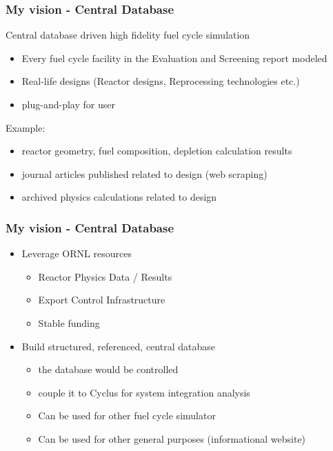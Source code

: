 \begin{frame}
    \frametitle{My vision - Central Database}
    Central database driven high fidelity fuel cycle simulation
    \begin{itemize}
        \item Every fuel cycle facility in the Evaluation and Screening report modeled
        \item Real-life designs (Reactor designs, Reprocessing technologies etc.)
        \item plug-and-play for user
    \end{itemize}
    Example:
    \begin{itemize}
        \item reactor geometry, fuel composition, depletion calculation results
        \item journal articles published related to design (web scraping)
        \item archived physics calculations related to design
    \end{itemize}
\end{frame}


\begin{frame}
    \frametitle{My vision - Central Database}
    \begin{itemize}
        \item Leverage ORNL resources
        \begin{itemize}
            \item Reactor Physics Data / Results
            \item Export Control Infrastructure
            \item Stable funding
        \end{itemize}
        \item Build structured, referenced, central database
        \begin{itemize}
            \item the database would be controlled
            \item couple it to Cyclus for system integration analysis
            \item Can be used for other fuel cycle simulator
            \item Can be used for other general purposes (informational website)
        \end{itemize}
    \end{itemize}
\end{frame}

